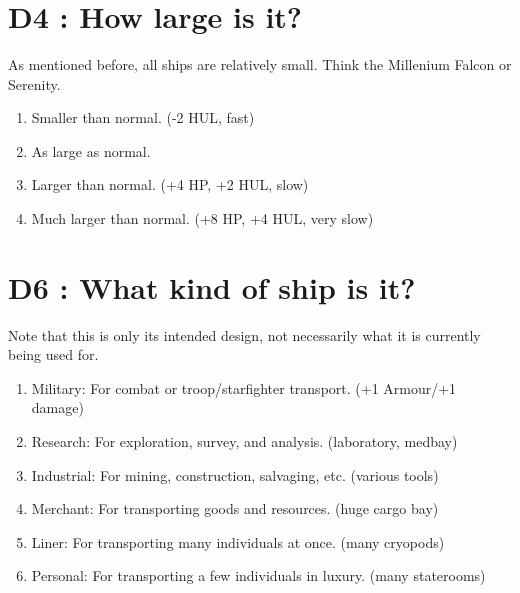 \documentclass{article}
\begin{document}
\title{\vspace{-0.5cm}{\Huge One Roll Spaceships} \vspace{-1cm}}

\date{}

\maketitle

\section*{D4 : How large is it?}
As mentioned before, all ships are relatively small. Think the Millenium Falcon or Serenity.
\begin{enumerate}
	\item Smaller than normal. (-2 HUL, fast)
	\item As large as normal.
	\item Larger than normal. (+4 HP, +2 HUL, slow)
	\item Much larger than normal. (+8 HP, +4 HUL, very slow)
\end{enumerate}

\section*{D6 : What kind of ship is it?}
Note that this is only its intended design, not necessarily what it is currently being used for.
\begin{enumerate}
	\item Military: For combat or troop/starfighter transport. (+1 Armour/+1 damage)
	\item Research: For exploration, survey, and analysis. (laboratory, medbay)
	\item Industrial: For mining, construction, salvaging, etc. (various tools)
	\item Merchant: For transporting goods and resources. (huge cargo bay)
	\item Liner: For transporting many individuals at once. (many cryopods)
	\item Personal: For transporting a few individuals in luxury. (many staterooms)	
\end{enumerate}
\end{document}
